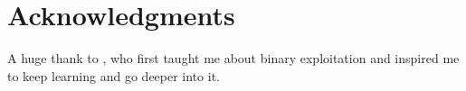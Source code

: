 \chapter*{Acknowledgments}

A huge thank to , who first taught me about binary exploitation and inspired me to keep learning and go deeper into it. 